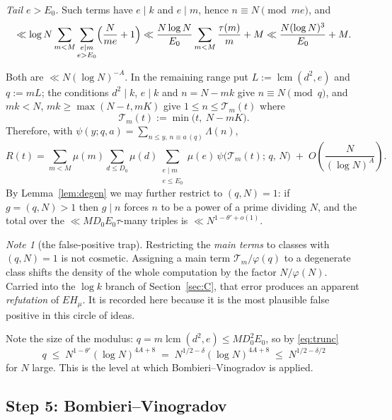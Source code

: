 \documentclass[11pt,a4paper]{article}
\theoremstyle{plain}
\theoremstyle{definition}
\theoremstyle{remark}
\newtheorem{note}[theorem]{Note}
\newcommand{\Tcut}{\mathcal T}
\DeclareMathOperator{\lcm}{lcm}
\begin{document}
\emph{Tail $e>E_0$.} Such terms have $e\mid k$ and $e\mid m$, hence
$n\equiv N\pmod{me}$, and
\[
  \ll\log N\sum_{m<M}\sum_{\substack{e\mid m\\ e>E_0}}
      \Bigl(\frac{N}{me}+1\Bigr)
  \ll\frac{N\log N}{E_0}\sum_{m<M}\frac{\tau(m)}{m}+M
  \ll\frac{N(\log N)^{3}}{E_0}+M .
\]

Both are $\ll N(\log N)^{-A}$. In the remaining range put
$L:=\lcm(d^2,e)$ and $q:=mL$; the conditions $d^2\mid k$, $e\mid k$
and $n=N-mk$ give $n\equiv N\pmod q$, and $mk<N$,
$mk\ge\max(N-t,mK)$ give $1\le n\le\Tcut_m(t)$ where
\begin{equation}\label{eq:Tm}
  \Tcut_m(t):=\min\bigl(t,\ N-mK\bigr).
\end{equation}
Therefore, with $\psi(y;q,a)=\sum_{n\le y,\,n\equiv a\,(q)}\Lambda(n)$,
\begin{equation}\label{eq:R2}
  R(t)=\sum_{m<M}\mu(m)\sum_{d\le D_0}\mu(d)
         \sum_{\substack{e\mid m\\ e\le E_0}}\mu(e)\,
         \psi\bigl(\Tcut_m(t);\,q,\,N\bigr)
         \;+\;O\!\left(\frac{N}{(\log N)^{A}}\right).
\end{equation}
By Lemma~\ref{lem:degen} we may further restrict to $(q,N)=1$: if
$g=(q,N)>1$ then $g\mid n$ forces $n$ to be a power of a prime
dividing $N$, and the total over the $\ll MD_0E_0\tau$-many triples is
$\ll N^{1-\theta'+o(1)}$.

\begin{note}[the false-positive trap]\label{note:trap}
Restricting the \emph{main terms} to classes with $(q,N)=1$ is not
cosmetic. Assigning a main term $\Tcut_m/\varphi(q)$ to a degenerate class
shifts the density of the whole computation by the factor
$N/\varphi(N)$. Carried into the $\log k$ branch of
Section~\ref{sec:C}, that error produces an apparent \emph{refutation}
of $EH_\mu$. It is recorded here because it is the most plausible
false positive in this circle of ideas.
\end{note}

Note the size of the modulus: $q=m\lcm(d^2,e)\le MD_0^2E_0$, so by
\eqref{eq:trunc}
\begin{equation}\label{eq:level}
  q\;\le\;N^{1-\theta'}(\log N)^{4A+8}\;=\;N^{1/2-\delta}(\log N)^{4A+8}
  \;\le\;N^{1/2-\delta/2}
\end{equation}
for $N$ large. This is the level at which Bombieri--Vinogradov is
applied.

\subsection{Step 5: Bombieri--Vinogradov}
\end{document}
